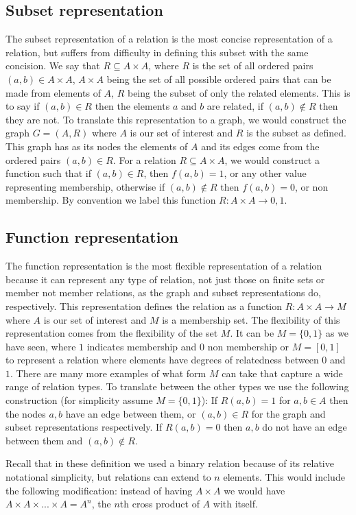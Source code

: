 \documentclass{article}
\begin{document}
\subsection{Subset representation}
The subset representation of a relation is the most concise representation of a relation, but suffers from difficulty in defining this subset with the same concision. We say that $R \subseteq A\times A$, where $R$ is the set of all ordered pairs $(a,b)\in A\times A$, $A\times A$ being the set of all possible ordered pairs that can be made from elements of $A$, $R$ being the subset of only the related elements. This is to say if $(a,b)\in R$ then the elements $a$ and $b$ are related, if $(a,b)\notin R$ then they are not. To translate this representation to a graph, we would construct the graph $G = (A,R)$ where $A$ is our set of interest and $R$ is the subset as defined. This graph has as its nodes the elements of $A$ and its edges come from the ordered pairs $(a,b)\in R$. For a relation $R\subseteq A\times A$, we would construct a function such that if $(a,b)\in R$, then $f(a,b) = 1$, or any other value representing membership, otherwise if $(a,b)\notin R$ then $f(a,b) = 0$, or non membership. By convention we label this function $R: A\times A\to {0,1}$. 

\subsection{Function representation}
The function representation is the most flexible representation of a relation because it can represent any type of relation, not just those on finite sets or member not member relations, as the graph and subset representations do, respectively. This representation defines the relation as a function $R:A\times A\to M$ where $A$ is our set of interest and $M$ is a membership set. The flexibility of this representation comes from the flexibility of the set $M$. It can be $M=\{0,1\}$ as we have seen, where $1$ indicates membership and $0$ non membership or $M=[0,1]$ to represent a relation where elements have degrees of relatedness between $0$ and $1$. There are many more examples of what form $M$ can take that capture a wide range of relation types. To translate between the other types we use the following construction (for simplicity assume $M=\{0,1\}$): If $R(a,b) = 1$ for $a,b\in A$ then the nodes $a,b$ have an edge between them, or $(a,b)\in R$ for the graph and subset representations respectively. If $R(a,b) = 0$ then $a,b$ do not have an edge between them and $(a,b)\notin R$. 

Recall that in these definition we used a binary relation because of its relative notational simplicity, but relations can extend to $n$ elements. This would include the following modification: instead of having $A\times A$ we would have $A\times A\times ... \times A = A^n$, the $n$th cross product of $A$ with itself. 
\end{document}
